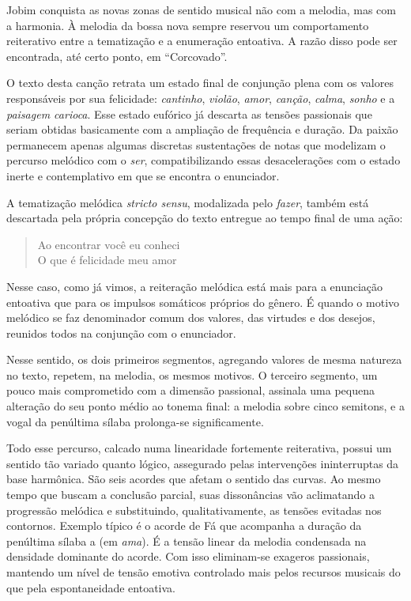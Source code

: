 Jobim conquista as novas zonas de sentido musical não com a melodia, mas
com a harmonia. À melodia da bossa nova sempre reservou um comportamento
reiterativo entre a tematização e a enumeração entoativa. A razão disso
pode ser encontrada, até certo ponto, em ``Corcovado''.

O texto desta canção retrata um estado final de conjunção plena com os
valores responsáveis por sua felicidade: \textit{cantinho}, \textit{violão}, \textit{amor},
\textit{canção}, \textit{calma}, \textit{sonho} e a \textit{paisagem carioca}. Esse estado eufórico já
descarta as tensões passionais que seriam obtidas basicamente com a
ampliação de frequência e duração. Da paixão permanecem apenas algumas
discretas sustentações de notas que modelizam o percurso melódico com o
\textit{ser}, compatibilizando essas desacelerações com o estado inerte e
contemplativo em que se encontra o enunciador.

A tematização melódica \textit{stricto sensu}, modalizada pelo \textit{fazer}, também
está descartada pela própria concepção do texto entregue ao tempo final
de uma ação:

\begin{verse}
Ao encontrar você eu conheci\\
O que é felicidade meu amor
\end{verse}

Nesse caso, como já vimos, a reiteração melódica está mais para a
enunciação entoativa que para os impulsos somáticos próprios do gênero.
É quando o motivo melódico se faz denominador comum dos valores, das
virtudes e dos desejos, reunidos todos na conjunção com o enunciador.

Nesse sentido, os dois primeiros segmentos, agregando valores de mesma
natureza no texto, repetem, na melodia, os mesmos motivos. O terceiro
segmento, um pouco mais comprometido com a dimensão passional, assinala
uma pequena alteração do seu ponto médio ao tonema final: a melodia
sobre cinco semitons, e a vogal da penúltima sílaba prolonga-se
significamente.


Todo esse percurso, calcado numa linearidade fortemente reiterativa,
possui um sentido tão variado quanto lógico, assegurado pelas
intervenções ininterruptas da base harmônica. São seis acordes que
afetam o sentido das curvas. Ao mesmo tempo que buscam a conclusão
parcial, suas dissonâncias vão aclimatando a progressão melódica e
substituindo, qualitativamente, as tensões evitadas nos contornos.
Exemplo típico é o acorde de Fá que acompanha a duração da penúltima
sílaba a (em \textit{ama}). É a tensão linear da melodia condensada na
densidade dominante do acorde. Com isso eliminam-se exageros passionais,
mantendo um nível de tensão emotiva controlado mais pelos recursos
musicais do que pela espontaneidade entoativa.

